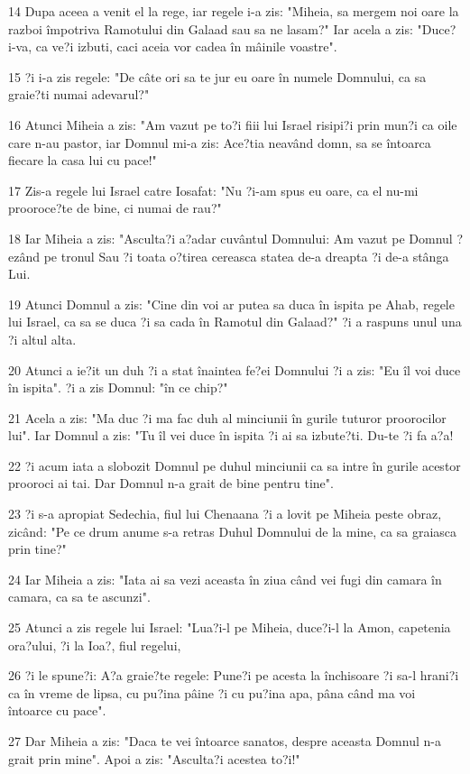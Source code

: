 \par 14 Dupa aceea a venit el la rege, iar regele i-a zis: "Miheia, sa mergem noi oare la razboi împotriva Ramotului din Galaad sau sa ne lasam?" Iar acela a zis: "Duce?i-va, ca ve?i izbuti, caci aceia vor cadea în mâinile voastre".
\par 15 ?i i-a zis regele: "De câte ori sa te jur eu oare în numele Domnului, ca sa graie?ti numai adevarul?"
\par 16 Atunci Miheia a zis: "Am vazut pe to?i fiii lui Israel risipi?i prin mun?i ca oile care n-au pastor, iar Domnul mi-a zis: Ace?tia neavând domn, sa se întoarca fiecare la casa lui cu pace!"
\par 17 Zis-a regele lui Israel catre Iosafat: "Nu ?i-am spus eu oare, ca el nu-mi prooroce?te de bine, ci numai de rau?"
\par 18 Iar Miheia a zis: "Asculta?i a?adar cuvântul Domnului: Am vazut pe Domnul ?ezând pe tronul Sau ?i toata o?tirea cereasca statea de-a dreapta ?i de-a stânga Lui.
\par 19 Atunci Domnul a zis: "Cine din voi ar putea sa duca în ispita pe Ahab, regele lui Israel, ca sa se duca ?i sa cada în Ramotul din Galaad?" ?i a raspuns unul una ?i altul alta.
\par 20 Atunci a ie?it un duh ?i a stat înaintea fe?ei Domnului ?i a zis: "Eu îl voi duce în ispita". ?i a zis Domnul: "în ce chip?"
\par 21 Acela a zis: "Ma duc ?i ma fac duh al minciunii în gurile tuturor proorocilor lui". Iar Domnul a zis: "Tu îl vei duce în ispita ?i ai sa izbute?ti. Du-te ?i fa a?a!
\par 22 ?i acum iata a slobozit Domnul pe duhul minciunii ca sa intre în gurile acestor prooroci ai tai. Dar Domnul n-a grait de bine pentru tine".
\par 23 ?i s-a apropiat Sedechia, fiul lui Chenaana ?i a lovit pe Miheia peste obraz, zicând: "Pe ce drum anume s-a retras Duhul Domnului de la mine, ca sa graiasca prin tine?"
\par 24 Iar Miheia a zis: "Iata ai sa vezi aceasta în ziua când vei fugi din camara în camara, ca sa te ascunzi".
\par 25 Atunci a zis regele lui Israel: "Lua?i-l pe Miheia, duce?i-l la Amon, capetenia ora?ului, ?i la Ioa?, fiul regelui,
\par 26 ?i le spune?i: A?a graie?te regele: Pune?i pe acesta la închisoare ?i sa-l hrani?i ca în vreme de lipsa, cu pu?ina pâine ?i cu pu?ina apa, pâna când ma voi întoarce cu pace".
\par 27 Dar Miheia a zis: "Daca te vei întoarce sanatos, despre aceasta Domnul n-a grait prin mine". Apoi a zis: "Asculta?i acestea to?i!"
